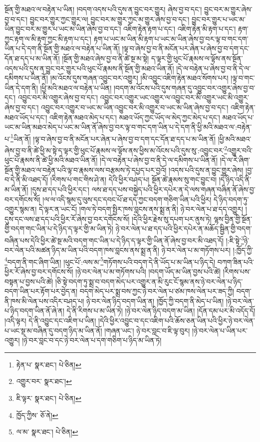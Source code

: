སྔོན་གྱི་མཐའ་ལ་བརྟེན་པ་ཡིན། །བདག་འདས་པའི་དུས་ན་བྱུང་བར་གྱུར། ཞེས་བྱ་བ་དང་། བྱུང་བར་མ་གྱུར་ཞེས་བྱ་བ་དང་། བྱུང་བར་གྱུར་ཀྱང་གྱུར་ལ། བྱུང་བར་མ་གྱུར་ཀྱང་མ་གྱུར་ཞེས་བྱ་བ་དང་། བྱུང་བར་གྱུར་པ་ཡང་མ་ཡིན་བྱུང་བར་མ་གྱུར་པ་ཡང་མ་ཡིན་ཞེས་བྱ་བ་དང་། འཇིག་རྟེན་རྟག་པ་དང་། འཇིག་རྟེན་མི་རྟག་པ་དང་། རྟག་ཀྱང་རྟག་ལ་མི་རྟག་ཀྱང་མི་རྟག་པ་དང་། རྟག་པ་ཡང་མ་ཡིན་མི་རྟག་པ་ཡང་མ་ཡིན་ཞེས་བྱ་བར་ལྟ་བ་གང་དག་ཡིན་པ་དེ་དག་ནི་སྔོན་གྱི་མཐའ་ལ་བརྟེན་པ་ཡིན་ནོ། །ལྟ་བ་ཞེས་བྱ་བ་ནི་མངོན་པར་ཞེན་པ་ཞེས་བྱ་བ་དག་དང་དོན་ཐ་དད་པ་མ་ཡིན་ནོ། །སྔོན་གྱི་མཐའ་ཞེས་བྱ་བ་ནི་ཚེ་སྔ་མ་སྟེ། ད་ལྟར་གྱི་ཕུང་པོ་རྣམས་ལ་ལྟོས་ནས་སྔོན་འདས་པའི་དུས་ན་བྱུང་བར་གྱུར་པའི་ཕུང་པོ་རྣམས་ནི་སྔོན་གྱི་མཐའ་ཡིན་ནོ། །དེ་ལ་བརྟེན་པ་ཞེས་བྱ་བ་ནི་དེ་ལ་དམིགས་པ་ཡིན་ནོ། །མ་འོངས་དུས་གཞན་འབྱུང་བར་འགྱུར། །མི་འབྱུང་འཇིག་རྟེན་མཐའ་སོགས་པར། །ལྟ་བ་གང་ཡིན་དེ་དག་ནི། །ཕྱི་མའི་མཐའ་ལ་བརྟེན་པ་ཡིན། །བདག་མ་འོངས་པའི་དུས་གཞན་དུ་འབྱུང་བར་འགྱུར་ཞེས་བྱ་བ་དང་། འབྱུང་བར་མི་འགྱུར་ཞེས་བྱ་བ་དང་། འབྱུང་བར་འགྱུར་ཡང་འགྱུར་ལ་འབྱུང་བར་མི་འགྱུར་ཡང་མི་འགྱུར་ཞེས་བྱ་བ་དང་། འབྱུང་བར་འགྱུར་བ་ཡང་མ་ཡིན་འབྱུང་བར་མི་འགྱུར་བ་ཡང་མ་ཡིན་ཞེས་བྱ་བ་དང་། འཇིག་རྟེན་མཐའ་ཡོད་པ་དང་། འཇིག་རྟེན་མཐའ་མེད་པ་དང་། མཐའ་ཡོད་ཀྱང་ཡོད་ལ་མེད་ཀྱང་མེད་པ་དང་། མཐའ་ཡོད་པ་ཡང་མ་ཡིན་མཐའ་མེད་པ་ཡང་མ་ཡིན་ནོ་ཞེས་བྱ་བར་ལྟ་བ་གང་དག་ཡིན་པ་དེ་དག་ནི་ཕྱི་མའི་མཐའ་ལ་:བརྟེན་པ་\footnote{རྟེན་པ་  སྣར་ཐང་།  པེ་ཅིན། }ཡིན་ནོ། །ལྟ་བ་ཞེས་བྱ་བ་ནི་མངོན་པར་ཞེན་པ་ཞེས་བྱ་བ་དག་དང་དོན་ཐ་དད་པ་མ་ཡིན་ནོ། །ཕྱི་མའི་མཐའ་ཞེས་བྱ་བ་ནི་ཚེ་ཕྱི་མ་སྟེ་ད་ལྟར་གྱི་ཕུང་པོ་རྣམས་ལ་ལྟོས་ནས་ཕྱིས་མ་འོངས་པའི་དུས་སུ་:འབྱུང་བར་\footnote{འགྱུར་བར་  སྣར་ཐང་། }འགྱུར་བའི་ཕུང་པོ་རྣམས་ནི་ཚེ་ཕྱི་མའི་མཐའ་ཡིན་ནོ། །དེ་ལ་བརྟེན་པ་ཞེས་བྱ་བ་ནི་དེ་ལ་དམིགས་པ་ཡིན་ནོ། །དེ་ལ་རེ་ཞིག་སྔོན་གྱི་མཐའ་ལ་བརྟེན་པའི་ལྟ་བ་རྣམས་ལས་བརྩམས་ཏེ་དཔྱད་པར་བྱའོ། །འདས་པའི་དུས་ན་བྱུང་གྱུར་ཞེས། །བྱ་བ་དེ་ནི་མི་འཐད་དོ། །རིགས་པ་གང་གིས་ཤེ་ན། དེའི་ཕྱིར་བཤད་པ། སྔོན་ཚེ་རྣམས་སུ་གང་བྱུང་བ། །དེ་ཉིད་འདི་ནི་མ་ཡིན་ནོ། །དུས་ཐ་དད་པའི་ཕྱིར་དང་། ལས་ཐ་དད་པས་བསྐྱེད་པའི་ཕྱིར་དཔེར་ན་དེ་ལས་གཞན་བཞིན་ནོ་ཞེས་བྱ་བར་དགོངས་སོ། །ལ་ལ་འདི་སྙམ་དུ་ལུས་དང་དབང་པོ་ཐ་དད་ཀྱང་བདག་གཅིག་ཡིན་པའི་ཕྱིར། དེ་ཉིད་བདག་ཏུ་འགྱུར་སྙམ་ན། དེ་ལྟར་ན་ཡང་ངོ། །གལ་ཏེ་བདག་སྤྱིར་ཁས་བླངས་ནས་སྨྲ་ན་ནི། ཉེ་བར་ལེན་པ་ཐ་དད་འགྱུར། །དུས་དང་ལས་ཐ་དད་པའི་ཕྱིར་རོ་ཞེས་བྱ་བར་དགོངས་སོ། །དེའི་ཕྱིར་རྗེས་སུ་དཔག་པར་ནུས་ཏེ། ལྷས་བྱིན་གྱི་སྔོན་གྱི་བདག་གང་ཡིན་པ་དེ་ཉིད་ད་ལྟར་གྱི་མ་ཡིན་ཏེ། ཉེ་བར་ལེན་པ་ཐ་དད་པའི་ཕྱིར་དཔེར་ན་མཆོད་སྦྱིན་གྱི་བདག་བཞིན་པས་དེའི་ཕྱིར་ཚེ་སྔ་མའི་བདག་གང་ཡིན་པ་དེ་ཉིད་ད་ལྟར་གྱི་ཡིན་ནོ་ཞེས་བྱ་བར་མི་འཐད་དོ། །:ཇི་སྟེ་\footnote{ཇི་ལྟར་  སྣར་ཐང་།  པེ་ཅིན། }ཉེ་བར་ལེན་པའི་མཚན་ཉིད་མ་ཡིན་པའི་བདག་ཁས་བླངས་ནས་སྨྲ་ན་ནི། ཉེ་བར་ལེན་པ་མ་གཏོགས་པར། །:ཁྱོད་ཀྱི་\footnote{ཁྱོད་ཀྱིས་  ཅོ་ནེ། }བདག་ནི་གང་ཞིག་ཡིན། །ཕུང་པོ་:ལས་མ་\footnote{ལ་མ་  སྣར་ཐང་།  པེ་ཅིན། }གཏོགས་པའི་བདག་དེ་ནི་ཡོད་པ་མ་ཡིན་པ་ཉིད་དེ། བཀག་ཟིན་པའི་ཕྱིར་རོ་ཞེས་བྱ་བར་དགོངས་སོ། །ཉེ་བར་ལེན་པ་མ་གཏོགས་པའི། །བདག་ཡོད་མ་ཡིན་བྱས་པའི་ཚེ། །རིགས་པས་བསྟན་པ་བྱས་པའི་ཚེ། །ཅི་སྟེ་བདག་ཏུ་སྨྲ་བ་བདག་མེད་པར་འགྱུར་ན་མི་རུང་ངོ་སྙམ་ནས་ཉེ་བར་ལེན་པ་ཉིད་བདག་ཡིན་པར་རྟོག་པར་བྱེད་ན། བདག་མེད་པར་སྨྲ་བས་ཀྱང་ཉེ་བར་ལེན་པ་ཙམ་ཁས་ལེན་པར་ཟད་ཀྱི། བདག་ནི་ཁས་མི་ལེན་པས་འདིར་བཤད་པ། ཉེ་བར་ལེན་ཉིད་བདག་ཡིན་ན། །ཁྱོད་ཀྱི་བདག་ནི་མེད་པ་ཡིན། །ཉེ་བར་ལེན་པ་ཉིད་བདག་ཡིན་ནོ་ཞེ་ན། དེ་ནི་རིགས་པ་མ་ཡིན་ཏེ། །ཉེ་བར་ལེན་ཉིད་བདག་མ་ཡིན། །དོན་དམ་པར་མི་འདོད་དོ། །འདི་ལྟར། དེ་ནི་འབྱུང་དང་འཇིག་པ་ཡིན། །དེའི་ཕྱིར་འབྱུང་བ་དང་འཇིག་པའི་ཆོས་ཅན་ཡིན་པའི་ཕྱིར་ཉེ་བར་ལེན་པ་ཡང་སྔ་མ་བཞིན་དུ་བདག་ཉིད་མ་ཡིན་ནོ། །གཞན་ཡང་། ཉེ་བར་བླང་བ་ཇི་ལྟ་བུར། །ཉེ་བར་ལེན་པ་ཡིན་པར་འགྱུར། །ཉེ་བར་བླང་བ་དང་ཉེ་བར་ལེན་པ་དག་གཅིག་པ་ཉིད་མ་ཡིན་ཏེ། 